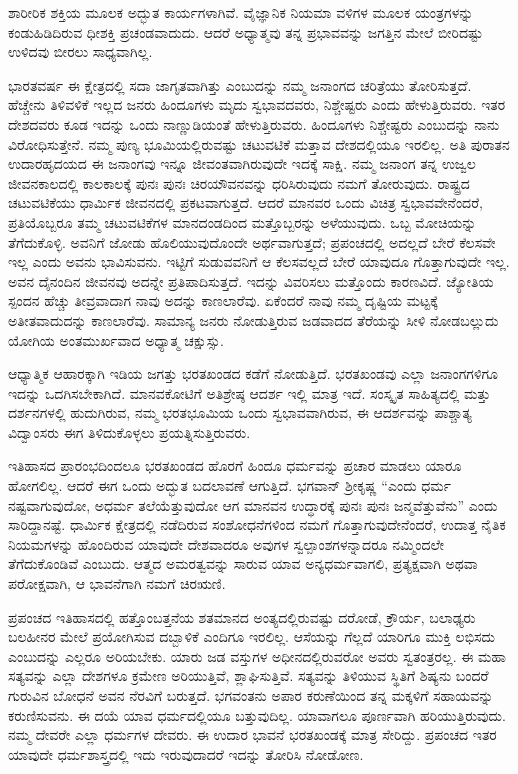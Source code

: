 ಶಾರೀರಿಕ ಶಕ್ತಿಯ ಮೂಲಕ ಅದ್ಭುತ ಕಾರ್ಯಗಳಾಗಿವೆ. ವೈಜ್ಞಾನಿಕ ನಿಯಮಾ ವಳಿಗಳ ಮೂಲಕ ಯಂತ್ರಗಳನ್ನು ಕಂಡುಹಿಡಿದಿರುವ ಧೀಶಕ್ತಿ ಪ್ರಚಂಡವಾದುದು. ಆದರೆ ಅಧ್ಯಾತ್ಮವು ತನ್ನ ಪ್ರಭಾವವನ್ನು ಜಗತ್ತಿನ ಮೇಲೆ ಬೀರಿದಷ್ಟು ಉಳಿದವು ಬೀರಲು ಸಾಧ್ಯವಾಗಿಲ್ಲ.

ಭಾರತವರ್ಷ ಈ ಕ್ಷೇತ್ರದಲ್ಲಿ ಸದಾ ಜಾಗೃತವಾಗಿತ್ತು ಎಂಬುದನ್ನು ನಮ್ಮ ಜನಾಂಗದ ಚರಿತ್ರೆಯು ತೋರಿಸುತ್ತದೆ. ಹೆಚ್ಚೇನು ತಿಳಿವಳಿಕೆ ಇಲ್ಲದ ಜನರು ಹಿಂದೂಗಳು ಮೃದು ಸ್ವಭಾವದವರು, ನಿಶ್ಚೇಷ್ಟರು ಎಂದು ಹೇಳುತ್ತಿರುವರು. ಇತರ ದೇಶದವರು ಕೂಡ ಇದನ್ನು ಒಂದು ನಾಣ್ಣುಡಿಯಂತೆ ಹೇಳುತ್ತಿರುವರು. ಹಿಂದೂಗಳು ನಿಶ್ಚೇಷ್ಟರು ಎಂಬುದನ್ನು ನಾನು ವಿರೋಧಿಸುತ್ತೇನೆ. ನಮ್ಮ ಪುಣ್ಯ ಭೂಮಿಯಲ್ಲಿರುವಷ್ಟು ಚಟುವಟಿಕೆ ಮತ್ತಾವ ದೇಶದಲ್ಲಿಯೂ ಇರಲಿಲ್ಲ. ಅತಿ ಪುರಾತನ ಉದಾರಹೃದಯದ ಈ ಜನಾಂಗವು ಇನ್ನೂ ಜೀವಂತವಾಗಿರುವುದೇ ಇದಕ್ಕೆ ಸಾಕ್ಷಿ. ನಮ್ಮ ಜನಾಂಗ ತನ್ನ ಉಜ್ವಲ ಜೀವನಕಾಲದಲ್ಲಿ ಕಾಲಕಾಲಕ್ಕೆ ಪುನಃ ಪುನಃ ಚಿರಯೌವನವನ್ನು ಧರಿಸಿರುವುದು ನಮಗೆ ತೋರುವುದು. ರಾಷ್ಟ್ರದ ಚಟುವಟಿಕೆಯು ಧಾರ್ಮಿಕ ಜೀವನದಲ್ಲಿ ಪ್ರಕಟವಾಗುತ್ತದೆ. ಆದರೆ ಮಾನವರ ಒಂದು ವಿಚಿತ್ರ ಸ್ವಭಾವವೇನೆಂದರೆ, ಪ್ರತಿಯೊಬ್ಬರೂ ತಮ್ಮ ಚಟುವಟಿಕೆಗಳ ಮಾನದಂಡದಿಂದ ಮತ್ತೊಬ್ಬರನ್ನು ಅಳೆಯುವುದು. ಒಬ್ಬ ಮೋಚಿಯನ್ನು ತೆಗೆದುಕೊಳ್ಳಿ. ಅವನಿಗೆ ಜೋಡು ಹೊಲಿಯುವುದೊಂದೇ ಅರ್ಥವಾಗುತ್ತದೆ; ಪ್ರಪಂಚದಲ್ಲಿ ಅದಲ್ಲದೆ ಬೇರೆ ಕೆಲಸವೇ ಇಲ್ಲ ಎಂದು ಅವನು ಭಾವಿಸುವನು. ಇಟ್ಟಿಗೆ ಸುಡುವವನಿಗೆ ಆ ಕೆಲಸವಲ್ಲದೆ ಬೇರೆ ಯಾವುದೂ ಗೊತ್ತಾಗುವುದೇ ಇಲ್ಲ. ಅವನ ದೈನಂದಿನ ಜೀವನವು ಅದನ್ನೇ ಪ್ರತಿಪಾದಿಸುತ್ತದೆ. ಇದನ್ನು ವಿವರಿಸಲು ಮತ್ತೊಂದು ಕಾರಣವಿದೆ. ಜ್ಯೋತಿಯ ಸ್ಪಂದನ ಹೆಚ್ಚು ತೀವ್ರವಾದಾಗ ನಾವು ಅದನ್ನು ಕಾಣಲಾರೆವು. ಏಕೆಂದರೆ ನಾವು ನಮ್ಮ ದೃಷ್ಟಿಯ ಮಟ್ಟಕ್ಕೆ ಅತೀತವಾದುದನ್ನು ಕಾಣಲಾರೆವು. ಸಾಮಾನ್ಯ ಜನರು ನೋಡುತ್ತಿರುವ ಜಡವಾದದ ತೆರೆಯನ್ನು ಸೀಳಿ ನೋಡಬಲ್ಲುದು ಯೋಗಿಯ ಅಂತಮುರ್ಖವಾದ ಅಧ್ಯಾತ್ಮ ಚಕ್ಷುಸ್ಸು.

ಆಧ್ಯಾತ್ಮಿಕ ಆಹಾರಕ್ಕಾಗಿ ಇಡಿಯ ಜಗತ್ತು ಭರತಖಂಡದ ಕಡೆಗೆ ನೋಡುತ್ತಿದೆ. ಭರತಖಂಡವು ಎಲ್ಲಾ ಜನಾಂಗಗಳಿಗೂ ಇದನ್ನು ಒದಗಿಸಬೇಕಾಗಿದೆ. ಮಾನವಕೋಟಿಗೆ ಅತಿಶ್ರೇಷ್ಠ ಆದರ್ಶ ಇಲ್ಲಿ ಮಾತ್ರ ಇದೆ. ಸಂಸ್ಕೃತ ಸಾಹಿತ್ಯದಲ್ಲಿ ಮತ್ತು ದರ್ಶನಗಳಲ್ಲಿ ಹುದುಗಿರುವ, ನಮ್ಮ ಭರತಭೂಮಿಯ ಒಂದು ಸ್ವಭಾವವಾಗಿರುವ, ಈ ಆದರ್ಶವನ್ನು ಪಾಶ್ಚಾತ್ಯ ವಿದ್ವಾಂಸರು ಈಗ ತಿಳಿದುಕೊಳ್ಳಲು ಪ್ರಯತ್ನಿಸುತ್ತಿರುವರು.

ಇತಿಹಾಸದ ಪ್ರಾರಂಭದಿಂದಲೂ ಭರತಖಂಡದ ಹೊರಗೆ ಹಿಂದೂ ಧರ್ಮವನ್ನು ಪ್ರಚಾರ ಮಾಡಲು ಯಾರೂ ಹೋಗಲಿಲ್ಲ. ಆದರೆ ಈಗ ಒಂದು ಅದ್ಭುತ ಬದಲಾವಣೆ ಆಗುತ್ತಿದೆ. ಭಗವಾನ್​ ಶ‍್ರೀಕೃಷ್ಣ “ಎಂದು ಧರ್ಮ ನಷ್ಟವಾಗುವುದೋ, ಅಧರ್ಮ ತಲೆಯೆತ್ತುವುದೋ ಆಗ ಮಾನವನ ಉದ್ಧಾರಕ್ಕೆ ಪುನಃ ಪುನಃ ಜನ್ಮವೆತ್ತುವೆನು” ಎಂದು ಸಾರಿದ್ದಾನಷ್ಟೆ. ಧಾರ್ಮಿಕ ಕ್ಷೇತ್ರದಲ್ಲಿ ನಡೆದಿರುವ ಸಂಶೋಧನೆಗಳಿಂದ ನಮಗೆ ಗೊತ್ತಾಗುವುದೇನೆಂದರೆ, ಉದಾತ್ತ ನೈತಿಕ ನಿಯಮಗಳನ್ನು ಹೊಂದಿರುವ ಯಾವುದೇ ದೇಶವಾದರೂ ಅವುಗಳ ಸ್ವಲ್ಪಾಂಶಗಳನ್ನಾದರೂ ನಮ್ಮಿಂದಲೇ ತೆಗೆದುಕೊಂಡಿವೆ ಎಂಬುದು. ಆತ್ಮದ ಅಮರತ್ವವನ್ನು ಸಾರುವ ಯಾವ ಅನ್ಯಧರ್ಮವಾಗಲಿ, ಪ್ರತ್ಯಕ್ಷವಾಗಿ ಅಥವಾ ಪರೋಕ್ಷವಾಗಿ, ಆ ಭಾವನೆಗಾಗಿ ನಮಗೆ ಚಿರಋಣಿ.

ಪ್ರಪಂಚದ ಇತಿಹಾಸದಲ್ಲಿ ಹತ್ತೊಂಬತ್ತನೆಯ ಶತಮಾನದ ಅಂತ್ಯದಲ್ಲಿರುವಷ್ಟು ದರೋಡೆ, ಕ್ರೌರ್ಯ, ಬಲಾಢ್ಯರು ಬಲಹೀನರ ಮೇಲೆ ಪ್ರಯೋಗಿಸುವ ದಬ್ಬಾಳಿಕೆ ಎಂದಿಗೂ ಇರಲಿಲ್ಲ. ಆಸೆಯನ್ನು ಗೆಲ್ಲದೆ ಯಾರಿಗೂ ಮುಕ್ತಿ ಲಭಿಸದು ಎಂಬುದನ್ನು ಎಲ್ಲರೂ ಅರಿಯಬೇಕು. ಯಾರು ಜಡ ವಸ್ತುಗಳ ಅಧೀನದಲ್ಲಿರುವರೋ ಅವರು ಸ್ವತಂತ್ರರಲ್ಲ. ಈ ಮಹಾ ಸತ್ಯವನ್ನು ಎಲ್ಲಾ ದೇಶಗಳೂ ಕ್ರಮೇಣ ಅರಿಯುತ್ತಿವೆ, ಶ್ಲಾಘಿಸುತ್ತಿವೆ. ಸತ್ಯವನ್ನು ತಿಳಿಯುವ ಸ್ಥಿತಿಗೆ ಶಿಷ್ಯನು ಬಂದರೆ ಗುರುವಿನ ಬೋಧನೆ ಅವನ ನೆರವಿಗೆ ಬರುತ್ತದೆ. ಭಗವಂತನು ಅಪಾರ ಕರುಣೆ\-ಯಿಂದ ತನ್ನ ಮಕ್ಕಳಿಗೆ ಸಹಾಯವನ್ನು ಕರುಣಿಸುವನು. ಈ ದಯೆ ಯಾವ ಧರ್ಮದಲ್ಲಿಯೂ ಬತ್ತುವುದಿಲ್ಲ. ಯಾವಾಗಲೂ ಪೂರ್ಣವಾಗಿ ಹರಿಯುತ್ತಿರುವುದು. ನಮ್ಮ ದೇವರೇ ಎಲ್ಲಾ ಧರ್ಮಗಳ ದೇವರು. ಈ ಉದಾರ ಭಾವನೆ ಭರತಖಂಡಕ್ಕೆ ಮಾತ್ರ ಸೇರಿದ್ದು. ಪ್ರಪಂಚದ ಇತರ ಯಾವುದೇ ಧರ್ಮಶಾಸ್ತ್ರದಲ್ಲಿ ಇದು ಇರುವುದಾದರೆ ಇದನ್ನು ತೋರಿಸಿ ನೋಡೋಣ.

